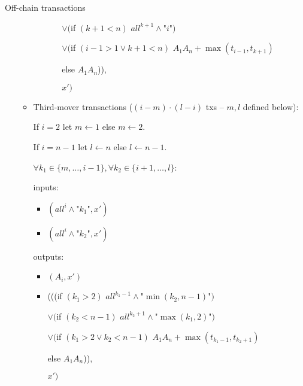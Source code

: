 \begin{notitlebox}{Off-chain transactions}
\begin{itemize}
\begin{itemize}
\begin{itemize}
\begin{itemize}
          $\vee ($if $(k+1 < n)$ $\mathit{all}^{k+1} \wedge \texttt{"}i\texttt{"})$

          $\vee ($if $(i-1 > 1 \vee k+1 < n)$ $A_1 A_n+\max{(t_{i-1}, t_{k+1})}$

          \:\:\: else $A_1 A_n$)),

          $x')$
        \end{itemize}
      \end{itemize}
      \item Third-mover transactions ($(i-m)\cdot(l-i)$ txs -- $m, l$ defined
      below):

      If $i = 2$ let $m \gets 1$ else $m \gets 2$.

      If $i = n-1$ let $l \gets n$ else $l \gets n-1$.

      $\forall k_1 \in \{m, \dots, i-1\}, \forall k_2 \in \{i+1, \dots, l\}$:

      inputs:
      \begin{itemize}
        \item $(\mathit{all}^i \wedge \texttt{"}k_1\texttt{"}, x')$
        \item $(\mathit{all}^i \wedge \texttt{"}k_2\texttt{"}, x')$
      \end{itemize}
      outputs:
      \begin{itemize}
        \item $(A_i, x')$
        \item (((if $(k_1 > 2)$ $\mathit{all}^{k_1-1} \wedge
        \texttt{"}\min{(k_2, n-1)}\texttt{"})$

        $\vee ($if $(k_2 < n - 1)$ $\mathit{all}^{k_2+1} \wedge
        \texttt{"}\max{(k_1, 2)}\texttt{"})$

        $\vee ($if $(k_1 > 2 \vee k_2 < n-1)$ $A_1 A_n+\max{(t_{k_1-1},
        t_{k_2+1})}$

        \:\:\: else $A_1 A_n$)),

        $x')$
      \end{itemize}
    \end{itemize}
  \end{itemize}
\end{notitlebox}
